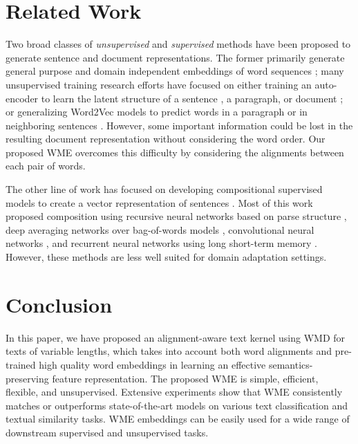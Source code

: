 \documentclass[11pt,a4paper]{article}
\newcommand{\1}{\boldsymbol{1}}
\begin{document}
\section{Related Work}
\label{sec:Related Work}
Two broad classes of \emph{unsupervised} and \emph{supervised} methods have been proposed to generate sentence and document representations. The former primarily generate general purpose and domain independent embeddings of word sequences \cite{socher2011dynamic,kiros2015skip,arora2017simple}; many unsupervised training research efforts have focused on either training an auto-encoder to learn the latent structure of a sentence \cite{socher2013recursive}, a paragraph, or document \cite{li2015hierarchical}; or generalizing Word2Vec models to predict words in a paragraph \cite{le2014distributed,Chen2017efficient} or in neighboring sentences \cite{kiros2015skip}. 
However, some important information could be lost in the resulting document representation without considering the word order. Our proposed WME overcomes this difficulty by considering the alignments between each pair of words. 

The other line of work has focused on developing compositional supervised models to create a vector representation of sentences \cite{kim2016character,gong2018document}. Most of this work proposed composition using recursive neural networks based on parse structure \cite{socher2012semantic,socher2013recursive}, deep averaging networks over bag-of-words models \cite{iyyer2015deep,wieting2015towards}, convolutional neural networks \cite{kim2014convolutional,kalchbrenner2014convolutional,xu2018graph2seq}, and recurrent neural networks using long short-term memory \cite{tai2015improved,liu2015multi}. However, these methods are less well suited for domain adaptation settings. 



\section{Conclusion}
 In this paper, we have proposed an alignment-aware text kernel using WMD for texts of variable lengths, which takes into account both word alignments and pre-trained high quality word embeddings in learning an effective semantics-preserving feature representation. The proposed WME is simple, efficient, flexible, and unsupervised. 
 Extensive experiments show that WME consistently matches or outperforms state-of-the-art models on various text classification and textual similarity tasks. WME embeddings can be easily used for a wide range of downstream supervised and unsupervised tasks. 
\end{document}
